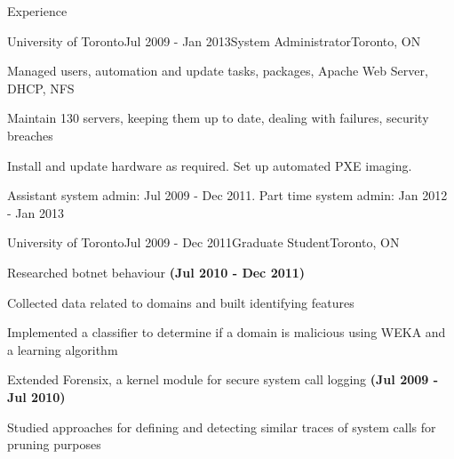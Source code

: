 \documentclass{resume}
\begin{document}
\begin{rSection}{Experience}
    \begin{comment}
    \begin{rSubsection}{OANDA Corporation}{Jan 2012 - Jan 2013}{Software Developer}{Toronto, ON}
      \item Created new and maintained old scripts used to report on the state of the system
      \item Collaborated with other teams to improve tools they maintain
      \item Added functionality into large, critical system components (C++)
      \item Worked with project managers and indirectly clients to meet client requirements
    \end{rSubsection}
    \end{comment}

    \begin{rSubsection}{University of Toronto}{Jul 2009 - Jan 2013}{System Administrator}{Toronto, ON}
      \item Managed users, automation and update tasks, packages, Apache Web Server, DHCP, NFS
      \item Maintain 130 servers, keeping them up to date, dealing with failures, security breaches
      \item Install and update hardware as required.  Set up automated PXE imaging.
      \item Assistant system admin: Jul 2009 - Dec 2011. Part time system admin: Jan 2012 - Jan 2013
    \end{rSubsection}

    \begin{rSubsection}{University of Toronto}{Jul 2009 - Dec 2011}{Graduate Student}{Toronto, ON}
      \item Researched botnet behaviour \textbf{(Jul 2010 - Dec 2011)}
      \item Collected data related to domains and built identifying features
      \item Implemented a classifier to determine if a domain is malicious using WEKA and a learning algorithm
      \vspace{1ex}
      \item Extended Forensix, a kernel module for secure system call logging \textbf{(Jul 2009 - Jul 2010)}
      \item Studied approaches for defining and detecting similar traces of system calls for pruning purposes
    \end{rSubsection}


\end{rSection}
\end{document}
